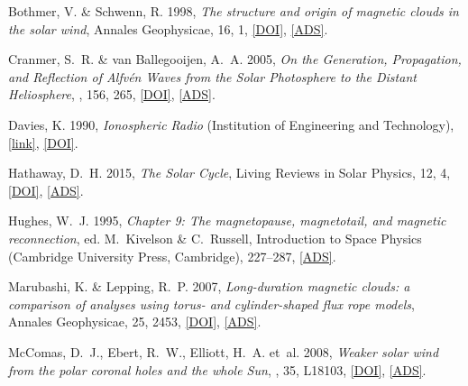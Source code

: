 
	{Bothmer}, V. \& {Schwenn}, R. 1998, \emph{{The structure and origin of magnetic clouds in the solar
	wind}}, Annales Geophysicae, 16, 1,
	\href{http://dx.doi.org/10.1007/s00585-997-0001-x}{[DOI]},
	\href{http://adsabs.harvard.edu/abs/1998AnGeo..16....1B}{[ADS]}.

	{Cranmer}, S.~R. \& {van Ballegooijen}, A.~A. 2005, \emph{{On the Generation,
	Propagation, and Reflection of Alfv{\'e}n Waves from the Solar Photosphere to
	the Distant Heliosphere}}, \apjs, 156, 265,
	\href{http://dx.doi.org/10.1086/426507}{[DOI]},
	\href{http://adsabs.harvard.edu/abs/2005ApJS..156..265C}{[ADS]}.

	Davies, K. 1990, \emph{Ionospheric Radio} (Institution of Engineering and
	Technology),
	\href{http://digital-library.theiet.org/content/books/ew/pbew031e}{[link]},
	\href{http://dx.doi.org/10.1049/PBEW031E}{[DOI]}.

	{Hathaway}, D.~H. 2015, \emph{{The Solar Cycle}}, Living Reviews in Solar
	Physics, 12, 4, \href{http://dx.doi.org/10.1007/lrsp-2015-4}{[DOI]},
	\href{http://adsabs.harvard.edu/abs/2015LRSP...12....4H}{[ADS]}.

	{Hughes}, W.~J. 1995, \emph{{Chapter 9: The magnetopause, magnetotail, and
	magnetic reconnection}}, ed. M.~Kivelson \& C.~Russell, Introduction to Space
	Physics (Cambridge University Press, Cambridge), 227--287,
	\href{http://adsabs.harvard.edu/abs/1995isp..book.....K}{[ADS]}.

	{Marubashi}, K. \& {Lepping}, R.~P. 2007, \emph{{Long-duration magnetic clouds:
	a comparison of analyses using torus- and cylinder-shaped flux rope models}},
	Annales Geophysicae, 25, 2453,
	\href{http://dx.doi.org/10.5194/angeo-25-2453-2007}{[DOI]},
	\href{http://adsabs.harvard.edu/abs/2007AnGeo..25.2453M}{[ADS]}.
	
	{McComas}, D.~J., {Ebert}, R.~W., {Elliott}, H.~A. {et~al.} 2008{},
	\emph{{Weaker solar wind from the polar coronal holes and the whole Sun}},
	\grl, 35, L18103, \href{http://dx.doi.org/10.1029/2008GL034896}{[DOI]},
	\href{http://adsabs.harvard.edu/abs/2008GeoRL..3518103M}{[ADS]}.

